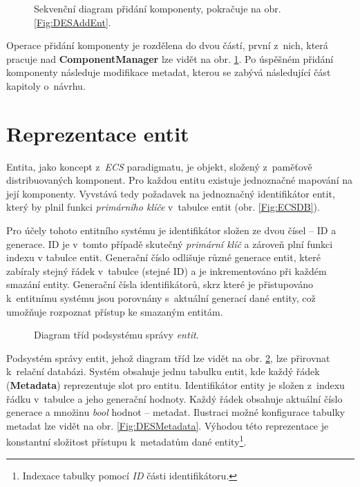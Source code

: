 \begin{figure}[H]
	\centering
	\caption{Sekvenční diagram přidání komponenty, pokračuje na obr. \ref{Fig:DESAddEnt}.}
	\label{Fig:DESAddComp}
\end{figure}

Operace přidání komponenty je rozdělena do dvou částí, první z~nich, která pracuje nad \textbf{ComponentManager} lze vidět na obr. \ref{Fig:DESAddComp}. Po úspěšném přidání komponenty následuje modifikace metadat, kterou se zabývá následující část kapitoly o~návrhu.

\section{Reprezentace entit}

Entita, jako koncept z~\emph{ECS} paradigmatu, je objekt, složený z~paměťově distribuovaných komponent. Pro každou entitu existuje jednoznačné mapování na její komponenty. Vyvstává tedy požadavek na jednoznačný identifikátor entit, který by plnil funkci \emph{primárního klíče} v~tabulce entit (obr. \ref{Fig:ECSDB}).

Pro účely tohoto entitního systému je identifikátor složen ze dvou čísel -- ID a generace. ID je v~tomto případě skutečný \emph{primární klíč} a zároveň plní funkci indexu v tabulce entit. Generační číslo odlišuje různé generace entit, které zabíraly stejný řádek v~tabulce (stejné ID) a je inkrementováno při každém smazání entity. Generační čísla identifikátorů, skrz které je přistupováno k~entitnímu systému jsou porovnány s~aktuální generací dané entity, což umožňuje rozpoznat přístup ke smazaným entitám.

\begin{figure}[H]
	\centering
	\caption{Diagram tříd podsystému správy \emph{entit}.}
	\label{Fig:DESEntityDiagram}
\end{figure}

Podsystém správy entit, jehož diagram tříd lze vidět na obr. \ref{Fig:DESEntityDiagram}, lze přirovnat k~relační databázi. Systém obsahuje jednu tabulku entit, kde každý řádek (\textbf{Metadata}) reprezentuje slot pro entitu. Identifikátor entity je složen z~indexu řádku v~tabulce a jeho generační hodnoty. Každý řádek obsahuje aktuální číslo generace a množinu \emph{bool} hodnot -- metadat. Ilustraci možné konfigurace tabulky metadat lze vidět na obr. \ref{Fig:DESMetadata}. Výhodou této reprezentace je konstantní složitost přístupu k~metadatům dané entity\footnote{Indexace tabulky pomocí \emph{ID} části identifikátoru.}. 


